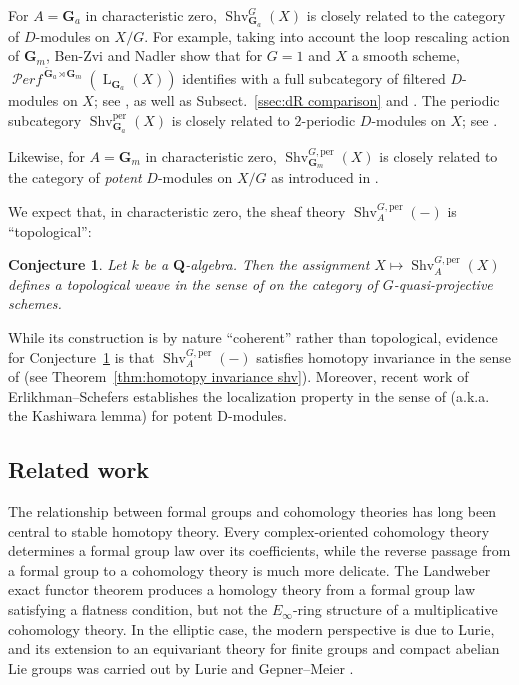 \documentclass[12pt, oneside]{amsart}
\numberwithin{equation}{section}
\newtheorem{conjecture}[subsubsection]{Conjecture}
\theoremstyle{remark}
\theoremstyle{plain}
\DeclareMathOperator{\PERF}{\mathcal{P}\textit{erf}}
\newcommand{\Loop}{\operatorname{L}}
\newcommand{\GG}{\mathbf{G}}
\newcommand{\GGa}{\mathbf{G}_{a}}
\newcommand{\GGm}{\mathbf{G}_{m}}
\newcommand{\bQ}{\mathbf{Q}}
\newcommand{\Shv}{\operatorname{Shv}}
\newcommand{\Shvper}{\operatorname{Shv}^{\mathrm{per}}}
\begin{document}
For $A = \GGa$ in characteristic zero, $\Shv_{\GGa}^G(X)$ is closely related to the category of $D$-modules on $X/G$.
For example, taking into account the loop rescaling action of $\GGm$, Ben-Zvi and Nadler show that for $G=1$ and $X$ a smooth scheme, $\PERF^{\,\check{\GG}_a \rtimes \GGm}(\Loop_{\GGa}(X))$ identifies with a full subcategory of filtered $D$-modules on $X$; see \cite[Cor.~5.2]{BNloop}, as well as Subsect.~\ref{ssec:dR comparison} and \cite{Preygel,Chen}.
The periodic subcategory $\Shvper_{\GGa}(X)$ is closely related to $2$-periodic $D$-modules on $X$; see \cite[Cor.~1.15]{BNloop}.

Likewise, for $A = \GGm$ in characteristic zero, $\Shv_{\GGm}^{G,\mathrm{per}}(X)$ is closely related to the category of \emph{potent} $D$-modules on $X/G$ as introduced in \cite{BZNpotent}.

We expect that, in characteristic zero, the sheaf theory $\Shv_A^{G,\mathrm{per}}(-)$ is ``topological'':

\begin{conjecture}\label{conj:weave}
  Let $k$ be a $\bQ$-algebra.
  Then the assignment $X \mapsto \Shv_A^{G,\mathrm{per}}(X)$ defines a topological weave in the sense of \cite[\S 3]{KhanWeaves} on the category of $G$-quasi-projective schemes.
\end{conjecture}

While its construction is by nature ``coherent'' rather than topological, evidence for Conjecture~\ref{conj:weave} is that $\Shv_A^{G,\mathrm{per}}(-)$ satisfies homotopy invariance in the sense of \cite[Def.~3.14]{KhanWeaves} (see Theorem~\ref{thm:homotopy invariance shv}).
Moreover, recent work of Erlikhman--Schefers \cite{ES} establishes the localization property in the sense of \cite[Def.~3.4]{KhanWeaves} (a.k.a. the Kashiwara lemma) for potent D-modules.

\subsection{Related work}\label{ssec:intro/related}

The relationship between formal groups and cohomology theories has long been central to stable homotopy theory.
Every complex-oriented cohomology theory determines a formal group law over its coefficients, while the reverse passage from a formal group to a cohomology theory is much more delicate.
The Landweber exact functor theorem produces a homology theory from a formal group law satisfying a flatness condition, but not the $E_\infty$-ring structure of a multiplicative cohomology theory.
In the elliptic case, the modern perspective is due to Lurie, and its extension to an equivariant theory for finite groups and compact abelian Lie groups was carried out by Lurie and Gepner--Meier \cite{LurieEllSurv,LurieEll1,LurieEll2,LurieEll3,GepMei}.
\end{document}
